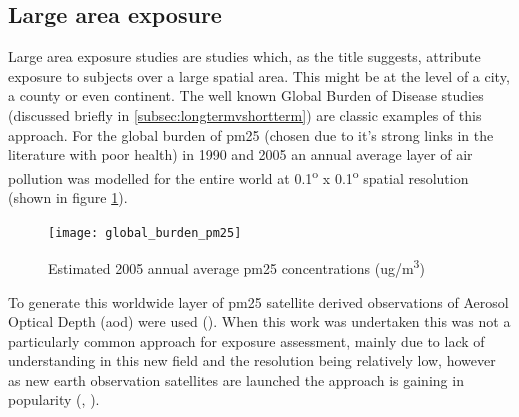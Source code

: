 \subsection{Large area exposure}
\label{subsec:largearea}

Large area exposure studies are studies which, as the title suggests, attribute exposure to subjects over a large spatial area. This might be at the level of a city, a county or even continent. The well known Global Burden of Disease studies (discussed briefly in \ref{subsec:longtermvshortterm}) are classic examples of this approach. For the global burden of \gls{pm25} (chosen due to it's strong links in the literature with poor health) in 1990 and 2005 an annual average layer of air pollution was modelled for the entire world at 0.1\textsuperscript{o} x 0.1\textsuperscript{o} spatial resolution (shown in figure \ref{fig:globalburdenpm25}).

\begin{figure}[H]
\centering
\texttt{[image: global\_burden\_pm25]}
\caption{Estimated 2005 annual average \gls{pm25} concentrations (ug/m\textsuperscript{3})}
\label{fig:globalburdenpm25}
\end{figure}

To generate this worldwide layer of \gls{pm25} satellite derived observations of Aerosol Optical Depth (\gls{aod}) were used (\cite{Brauer2012}). When this work was undertaken this was not a particularly common approach for exposure assessment, mainly due to lack of understanding in this new field and the resolution being relatively low, however as new earth observation satellites are launched the approach is gaining in popularity (\cite{VanDonkelaar2015}, \cite{Hoek2017}).

